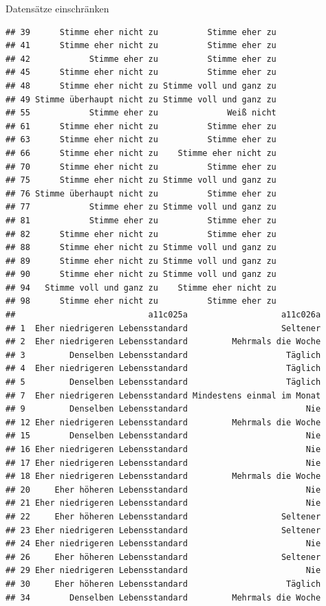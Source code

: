 \documentclass[ignorenonframetext,]{beamer}
\begin{document}
\begin{frame}[fragile]{Datensätze einschränken}
\begin{verbatim}
## 39      Stimme eher nicht zu          Stimme eher zu
## 41      Stimme eher nicht zu          Stimme eher zu
## 42            Stimme eher zu          Stimme eher zu
## 45      Stimme eher nicht zu          Stimme eher zu
## 48      Stimme eher nicht zu Stimme voll und ganz zu
## 49 Stimme überhaupt nicht zu Stimme voll und ganz zu
## 55            Stimme eher zu              Weiß nicht
## 61      Stimme eher nicht zu          Stimme eher zu
## 63      Stimme eher nicht zu          Stimme eher zu
## 66      Stimme eher nicht zu    Stimme eher nicht zu
## 70      Stimme eher nicht zu          Stimme eher zu
## 75      Stimme eher nicht zu Stimme voll und ganz zu
## 76 Stimme überhaupt nicht zu          Stimme eher zu
## 77            Stimme eher zu Stimme voll und ganz zu
## 81            Stimme eher zu          Stimme eher zu
## 82      Stimme eher nicht zu          Stimme eher zu
## 88      Stimme eher nicht zu Stimme voll und ganz zu
## 89      Stimme eher nicht zu Stimme voll und ganz zu
## 90      Stimme eher nicht zu Stimme voll und ganz zu
## 94   Stimme voll und ganz zu    Stimme eher nicht zu
## 98      Stimme eher nicht zu          Stimme eher zu
##                           a11c025a                   a11c026a
## 1  Eher niedrigeren Lebensstandard                   Seltener
## 2  Eher niedrigeren Lebensstandard         Mehrmals die Woche
## 3         Denselben Lebensstandard                    Täglich
## 4  Eher niedrigeren Lebensstandard                    Täglich
## 5         Denselben Lebensstandard                    Täglich
## 7  Eher niedrigeren Lebensstandard Mindestens einmal im Monat
## 9         Denselben Lebensstandard                        Nie
## 12 Eher niedrigeren Lebensstandard         Mehrmals die Woche
## 15        Denselben Lebensstandard                        Nie
## 16 Eher niedrigeren Lebensstandard                        Nie
## 17 Eher niedrigeren Lebensstandard                        Nie
## 18 Eher niedrigeren Lebensstandard         Mehrmals die Woche
## 20     Eher höheren Lebensstandard                        Nie
## 21 Eher niedrigeren Lebensstandard                        Nie
## 22     Eher höheren Lebensstandard                   Seltener
## 23 Eher niedrigeren Lebensstandard                   Seltener
## 24 Eher niedrigeren Lebensstandard                        Nie
## 26     Eher höheren Lebensstandard                   Seltener
## 29 Eher niedrigeren Lebensstandard                        Nie
## 30     Eher höheren Lebensstandard                    Täglich
## 34        Denselben Lebensstandard         Mehrmals die Woche

\end{verbatim}
\end{frame}
\end{document}
